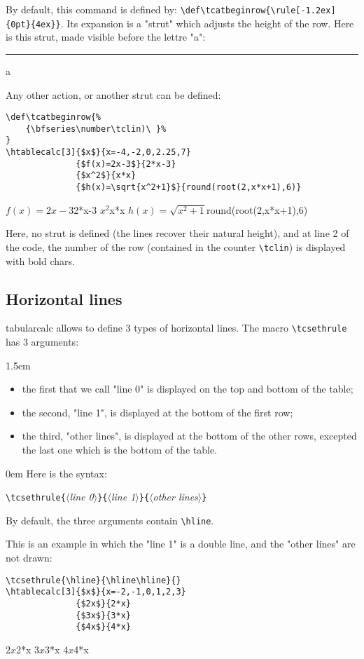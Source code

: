 \documentclass[a4paper,10pt]{article}
\newcommand\argu[1]{$\langle$\textit{#1}$\rangle$}
\newcommand\ARGU[1]{\texttt{\{}\argu{#1}\texttt{\}}}
\newcommand\tbcalc{\textsf{tabularcalc}\xspace}
\newcommand\verbinline{\lstinline[breaklines=false,basicstyle=\normalsize\ttfamily]}
\newcommand\mywidth{0.85\linewidth}
\begin{document}
By default, this command is defined by: \verbinline|\def\tcatbeginrow{\rule[-1.2ex]{0pt}{4ex}}|. Its expansion is a "strut" which adjusts the height of the row. Here is this strut, made visible before the lettre "a": \rule[-1.2ex]{2pt}{4ex}a\medskip

Any other action, or another strut can be defined:
\begin{center}
\begin{minipage}{\mywidth}
\begin{lstlisting}
\def\tcatbeginrow{%
	{\bfseries\number\tclin)\ }%
}
\htablecalc[3]{$x$}{x=-4,-2,0,2.25,7}
              {$f(x)=2x-3$}{2*x-3}
              {$x^2$}{x*x}
              {$h(x)=\sqrt{x^2+1}$}{round(root(2,x*x+1),6)}
\end{lstlisting}
\end{minipage}

\def\tcatbeginrow{%
	{\bfseries\number\tclin)\ }%
}
              {$f(x)=2x-3$}{2*x-3}
              {$x^2$}{x*x}
              {$h(x)=\sqrt{x^2+1}$}{round(root(2,x*x+1),6)}
\end{center}
Here, no strut is defined (the lines recover their natural height), and at line 2 of the code, the number of the row (contained in the counter \verbinline|\tclin|) is displayed with bold chars.

\subsection{Horizontal lines}
\tbcalc allows to define 3 types of horizontal lines. The macro \verbinline|\tcsethrule| has 3 arguments:

\parindent1.5em
\begin{itemize}
	\item the first that we call "line 0" is displayed on the top and bottom of the table;
	\item the second, "line 1", is displayed at the bottom of the first row;
	\item the third, "other lines", is displayed at the bottom of the other rows, excepted the last one which is the bottom of the table.
\end{itemize}\parindent0em
Here is the syntax:

\verbinline|\tcsethrule|\ARGU{line 0}\ARGU{line 1}\ARGU{other lines}
\medskip

By default, the three arguments contain \verbinline|\hline|.\medskip

This is an example in which the "line 1" is a double line, and the "other lines" are not drawn:
\begin{center}
\begin{minipage}{\mywidth}
\begin{lstlisting}
\tcsethrule{\hline}{\hline\hline}{}
\htablecalc[3]{$x$}{x=-2,-1,0,1,2,3}
              {$2x$}{2*x}
              {$3x$}{3*x}
              {$4x$}{4*x}
\end{lstlisting}
\end{minipage}

\tcsethrule{\hline}{\hline\hline}{}
              {$2x$}{2*x}
              {$3x$}{3*x}
              {$4x$}{4*x}
\end{center}
\end{document}
